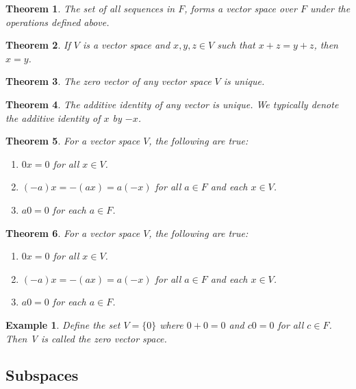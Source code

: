 \documentclass[a4paper]{article}
\newtheorem{mytheorem}{Theorem}
\newtheorem{example}{Example}
\numberwithin{mytheorem}{section}
\numberwithin{mydef}{section}
\numberwithin{example}{section}
\begin{document}
\begin{mytheorem} The set of all sequences in $F$, forms a vector space over $F$ under the operations defined above.  \end{mytheorem}

\begin{mytheorem} If $V$ is a vector space and $x,y,z \in V$ such that $x + z = y + z$, then $x = y$. \end{mytheorem}

\begin{mytheorem} The zero vector of any vector space $V$ is unique. \end{mytheorem}

\begin{mytheorem} The additive identity of any vector is unique. We typically denote the additive identity of $x$ by $-x$. \end{mytheorem}

\begin{mytheorem} For a vector space $V$, the following are true:
\begin{enumerate}
\item $0x = 0 $ for all $x \in V$.
\item $(-a)x = -(ax) = a(-x)$ for all $a \in F$ and each $x \in V$.
\item $a0 = 0$ for each $a \in F$. 
\end{enumerate}
\end{mytheorem}

\begin{mytheorem} For a vector space $V$, the following are true:
\begin{enumerate}
\item $0x = 0 $ for all $x \in V$.
\item $(-a)x = -(ax) = a(-x)$ for all $a \in F$ and each $x \in V$.
\item $a0 = 0$ for each $a \in F$. 
\end{enumerate}
\end{mytheorem}

\begin{example}
Define the set $V = \{ 0 \}$ where $0 + 0 = 0$ and $c0 = 0$ for all $c \in F$. Then V is called the zero vector space. 
\end{example}

\subsection{Subspaces}
\end{document}
